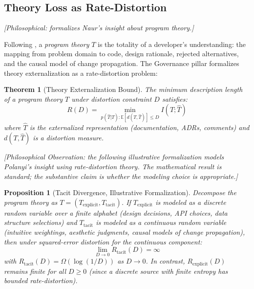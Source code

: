 \documentclass[11pt, a4paper, logo, copyright]{googledeepmind}
\newtheorem{theorem}{Theorem}[section]
\newtheorem{proposition}{Proposition}[section]
\begin{document}
\subsection{Theory Loss as Rate-Distortion}
\label{sec:gov-theory}
\emph{[Philosophical: formalizes Naur's insight about program theory.]}

Following \citet{naur1985}, a \emph{program theory} $T$ is the totality of a developer's understanding: the mapping from problem domain to code, design rationale, rejected alternatives, and the causal model of change propagation. The Governance pillar formalizes theory externalization as a rate-distortion problem:

\begin{theorem}[Theory Externalization Bound]
\label{thm:theory-loss}
The minimum description length of a program theory $T$ under distortion constraint $D$ satisfies:
\begin{equation}
    R(D) = \min_{p(\hat{T}|T): \mathbb{E}[d(T,\hat{T})] \leq D} I(T; \hat{T})
\end{equation}
where $\hat{T}$ is the externalized representation (documentation, ADRs, comments) and $d(T, \hat{T})$ is a distortion measure.
\end{theorem}

\emph{[Philosophical Observation: the following illustrative formalization models Polanyi's insight using rate-distortion theory. The mathematical result is standard; the substantive claim is whether the modeling choice is appropriate.]}

\begin{proposition}[Tacit Divergence, Illustrative Formalization]
\label{conj:tacit}
Decompose the program theory as $T = (T_{\mathrm{explicit}}, T_{\mathrm{tacit}})$. \emph{If} $T_{\mathrm{explicit}}$ is modeled as a discrete random variable over a finite alphabet (design decisions, API choices, data structure selections) and $T_{\mathrm{tacit}}$ is modeled as a continuous random variable (intuitive weightings, aesthetic judgments, causal models of change propagation), then under squared-error distortion for the continuous component:
\begin{equation}
    \lim_{D \to 0} R_{\mathrm{tacit}}(D) = \infty
\end{equation}
with $R_{\mathrm{tacit}}(D) = \Omega(\log(1/D))$ as $D \to 0$. In contrast, $R_{\mathrm{explicit}}(D)$ remains finite for all $D \geq 0$ (since a discrete source with finite entropy has bounded rate-distortion).
\end{proposition}
\end{document}
